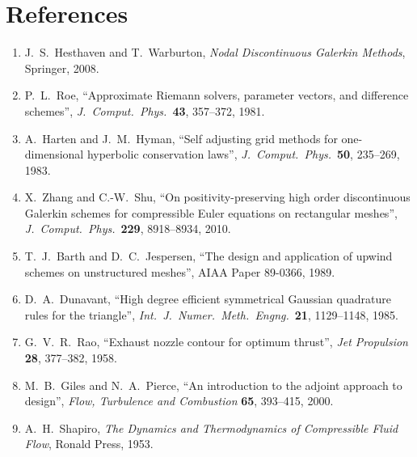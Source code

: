 \documentclass[11pt,a4paper]{article}
\begin{document}
\section*{References}

\begin{enumerate}\itemsep1pt
  \item J.\ S.\ Hesthaven and T.\ Warburton, \emph{Nodal Discontinuous Galerkin
    Methods}, Springer, 2008.
  \item P.\ L.\ Roe, ``Approximate Riemann solvers, parameter vectors, and
    difference schemes'', \emph{J.\ Comput.\ Phys.}\ \textbf{43}, 357--372, 1981.
  \item A.\ Harten and J.\ M.\ Hyman, ``Self adjusting grid methods for
    one-dimensional hyperbolic conservation laws'', \emph{J.\ Comput.\ Phys.}\
    \textbf{50}, 235--269, 1983.
  \item X.\ Zhang and C.-W.\ Shu, ``On positivity-preserving high order
    discontinuous Galerkin schemes for compressible Euler equations on
    rectangular meshes'', \emph{J.\ Comput.\ Phys.}\ \textbf{229}, 8918--8934, 2010.
  \item T.\ J.\ Barth and D.\ C.\ Jespersen, ``The design and application of
    upwind schemes on unstructured meshes'', AIAA Paper 89-0366, 1989.
  \item D.\ A.\ Dunavant, ``High degree efficient symmetrical Gaussian quadrature
    rules for the triangle'', \emph{Int.\ J.\ Numer.\ Meth.\ Engng.}\ \textbf{21},
    1129--1148, 1985.
  \item G.\ V.\ R.\ Rao, ``Exhaust nozzle contour for optimum thrust'',
    \emph{Jet Propulsion} \textbf{28}, 377--382, 1958.
  \item M.\ B.\ Giles and N.\ A.\ Pierce, ``An introduction to the adjoint
    approach to design'', \emph{Flow, Turbulence and Combustion} \textbf{65},
    393--415, 2000.
  \item A.\ H.\ Shapiro, \emph{The Dynamics and Thermodynamics of Compressible
    Fluid Flow}, Ronald Press, 1953.
\end{enumerate}
\end{document}
